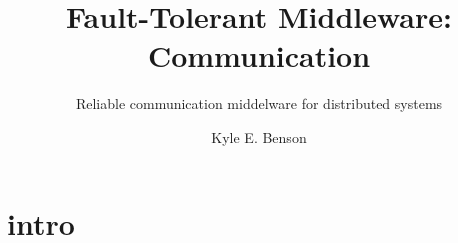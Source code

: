 \documentclass[pdftex]{beamer}
\begin{document}

\title[FT Comm. MW]{Fault-Tolerant Middleware: Communication}
\subtitle{Reliable communication middelware for distributed systems}
\author[K. Benson]{Kyle E. Benson}


\begin{frame}[plain]
	\titlepage
\end{frame}

\part{intro}
\end{document}
